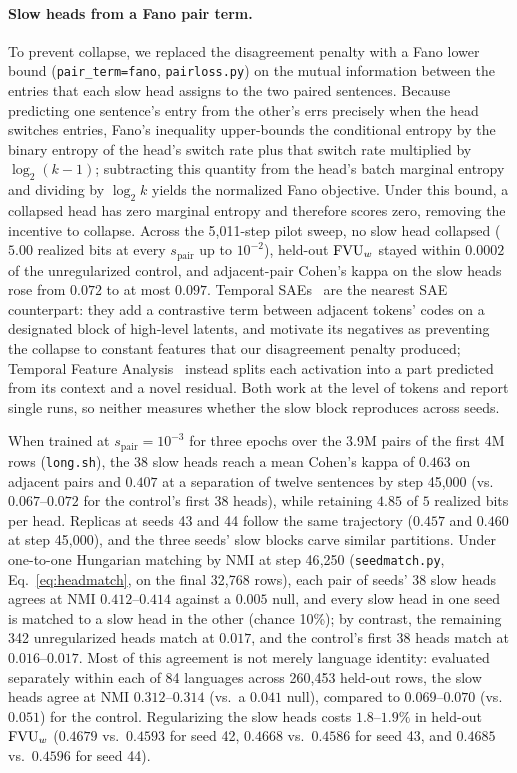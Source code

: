 \paragraph{Slow heads from a Fano pair term.}
To prevent collapse, we replaced the disagreement penalty with a Fano
lower bound (\texttt{pair\_term=fano}, \texttt{pairloss.py}) on the
mutual information between the entries that each slow head assigns to the
two paired sentences. Because predicting one sentence's entry from the
other's errs precisely when the head switches entries, Fano's inequality
upper-bounds the conditional entropy by the binary entropy of the head's
switch rate plus that switch rate multiplied by $\log_2(k-1)$;
subtracting this quantity from the head's batch marginal entropy and
dividing by $\log_2 k$ yields the normalized Fano objective. Under this
bound, a collapsed head has zero marginal entropy and therefore scores
zero, removing the incentive to collapse. Across the 5{,}011-step pilot
sweep, no slow head collapsed ($5.00$ realized bits at every
$s_{\mathrm{pair}}$ up to $10^{-2}$), held-out $\mathrm{FVU}_w$ stayed within
$0.0002$ of the unregularized control, and adjacent-pair Cohen's kappa on
the slow heads rose from $0.072$ to at most $0.097$. Temporal
SAEs~\cite{bhalla2026temporal} are the nearest SAE counterpart: they add
a contrastive term between adjacent tokens' codes on a designated block
of high-level latents, and motivate its negatives as preventing the
collapse to constant features that our disagreement penalty produced;
Temporal Feature Analysis~\cite{lubana2025priors} instead splits each
activation into a part predicted from its context and a novel residual.
Both work at the level of tokens and report single runs, so neither
measures whether the slow block reproduces across seeds.

When trained at $s_{\mathrm{pair}}{=}10^{-3}$ for three epochs over the
3.9M pairs of the first 4M rows (\texttt{long.sh}), the 38 slow heads
reach a mean Cohen's kappa of $0.463$ on adjacent pairs and $0.407$ at a
separation of twelve sentences by step 45{,}000 (vs.\ $0.067$--$0.072$
for the control's first 38 heads), while retaining $4.85$ of $5$ realized
bits per head. Replicas at seeds 43 and 44 follow the same trajectory
($0.457$ and $0.460$ at step 45{,}000), and the three seeds' slow blocks
carve similar partitions. Under one-to-one Hungarian matching by NMI at
step 46{,}250 (\texttt{seedmatch.py}, Eq.~\eqref{eq:headmatch}, on the
final 32{,}768 rows), each pair of seeds' 38 slow heads agrees at NMI
$0.412$--$0.414$ against a $0.005$ null, and every slow head in one seed
is matched to a slow head in the other (chance 10\%); by contrast, the
remaining 342 unregularized heads match at $0.017$, and the control's
first 38 heads match at $0.016$--$0.017$. Most of this agreement is not
merely language identity: evaluated separately within each of 84
languages across 260{,}453 held-out rows, the slow heads agree at NMI
$0.312$--$0.314$ (vs.\ a $0.041$ null), compared to $0.069$--$0.070$
(vs.\ $0.051$) for the control. Regularizing the slow heads costs
$1.8$--$1.9\%$ in held-out $\mathrm{FVU}_w$ ($0.4679$ vs.\ $0.4593$ for seed 42,
$0.4668$ vs.\ $0.4586$ for seed 43, and $0.4685$ vs.\ $0.4596$ for seed
44).

